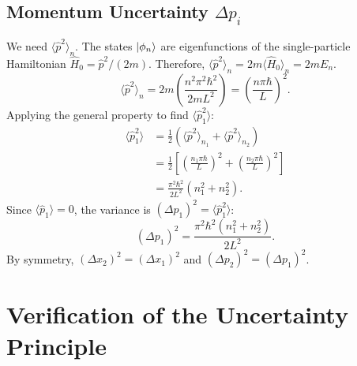 \subsection{Momentum Uncertainty $\Delta p_i$}
We need $\langle \hat{p}^2 \rangle_n$. The states $\ket{{\phi}_n}$
are eigenfunctions of the single-particle Hamiltonian
$\hat{H}_0 = \hat{p}^2/(2m)$. Therefore,
$\langle \hat{p}^2 \rangle_n = 2m \langle \hat{H}_0 \rangle_n = 2mE_n$.
\begin{equation}
  \langle \hat{p}^2 \rangle_n = 2m
  \left( \frac{n^2 \pi^2 \hbar^2}{2mL^2} \right)
  = \left( \frac{n\pi\hbar}{L} \right)^2.
\end{equation}
Applying the general property to find $\langle \hat{p}_1^2 \rangle$:
\begin{align}
  \langle \hat{p}_1^2 \rangle &= \frac{1}{2}
  \left( \langle \hat{p}^2 \rangle_{n_1} +
  \langle \hat{p}^2 \rangle_{n_2} \right) \nonumber \\
  &= \frac{1}{2} \left[ \left( \frac{n_1\pi\hbar}{L} \right)^2 +
  \left( \frac{n_2\pi\hbar}{L} \right)^2 \right] \nonumber \\
  &= \frac{\pi^2 \hbar^2}{2L^2} (n_1^2 + n_2^2).
\end{align}
Since $\langle \hat{p}_1 \rangle = 0$, the variance is
$(\Delta p_1)^2 = \langle \hat{p}_1^2 \rangle$:
\begin{equation}
  (\Delta p_1)^2 = \frac{\pi^2 \hbar^2 (n_1^2 + n_2^2)}{2L^2}.
\end{equation}
By symmetry, $(\Delta x_2)^2 = (\Delta x_1)^2$ and
$(\Delta p_2)^2 = (\Delta p_1)^2$.

\section{Verification of the Uncertainty Principle}


